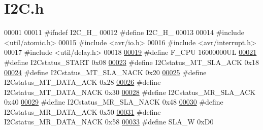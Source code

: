 \hypertarget{_i2_c_8h_source}{}\section{I2\+C.\+h}
\label{_i2_c_8h_source}

\begin{DoxyCode}
00001 
00011 \textcolor{preprocessor}{#ifndef I2C\_H\_}
00012 \textcolor{preprocessor}{#define I2C\_H\_}
00013 
00014 \textcolor{preprocessor}{#include <util/atomic.h>}
00015 \textcolor{preprocessor}{#include <avr/io.h>}
00016 \textcolor{preprocessor}{#include <avr/interrupt.h>}
00017 \textcolor{preprocessor}{#include <util/delay.h>}
00018 
\hypertarget{_i2_c_8h_source.tex_l00019}{}\hyperlink{_i2_c_8h_a43bafb28b29491ec7f871319b5a3b2f8}{00019} \textcolor{preprocessor}{#define F\_CPU 16000000UL                }
\hypertarget{_i2_c_8h_source.tex_l00021}{}\hyperlink{_i2_c_8h_ae106ed126eff0ffa33378daacfbbcdb7}{00021} \textcolor{preprocessor}{#define I2Cstatus\_START 0x08            }
\hypertarget{_i2_c_8h_source.tex_l00023}{}\hyperlink{_i2_c_8h_a86ef56020aa435f9af57015ee220c3e4}{00023} \textcolor{preprocessor}{#define I2Cstatus\_MT\_SLA\_ACK 0x18       }
\hypertarget{_i2_c_8h_source.tex_l00024}{}\hyperlink{_i2_c_8h_a28004b2b2ef10d3131ac4c4756da0ba0}{00024} \textcolor{preprocessor}{#define I2Cstatus\_MT\_SLA\_NACK 0x20      }
\hypertarget{_i2_c_8h_source.tex_l00025}{}\hyperlink{_i2_c_8h_a083e480a49a539cd4740d0e1a15216f3}{00025} \textcolor{preprocessor}{#define I2Cstatus\_MT\_DATA\_ACK 0x28      }
\hypertarget{_i2_c_8h_source.tex_l00026}{}\hyperlink{_i2_c_8h_a9de9a018a3f258d9e7a9ce44fb9e5cd1}{00026} \textcolor{preprocessor}{#define I2Cstatus\_MT\_DATA\_NACK 0x30     }
\hypertarget{_i2_c_8h_source.tex_l00028}{}\hyperlink{_i2_c_8h_af046bfee1b2f1837e8a043ead63f8152}{00028} \textcolor{preprocessor}{#define I2Cstatus\_MR\_SLA\_ACK 0x40       }
\hypertarget{_i2_c_8h_source.tex_l00029}{}\hyperlink{_i2_c_8h_ae17f24111fe34b4aa114e90824b7865a}{00029} \textcolor{preprocessor}{#define I2Cstatus\_MR\_SLA\_NACK 0x48      }
\hypertarget{_i2_c_8h_source.tex_l00030}{}\hyperlink{_i2_c_8h_aae56c6775054400d706c68b4701a1659}{00030} \textcolor{preprocessor}{#define I2Cstatus\_MR\_DATA\_ACK 0x50      }
\hypertarget{_i2_c_8h_source.tex_l00031}{}\hyperlink{_i2_c_8h_a3678a376b6b796511e60d0eda8a89dbe}{00031} \textcolor{preprocessor}{#define I2Cstatus\_MR\_DATA\_NACK 0x58     }
\hypertarget{_i2_c_8h_source.tex_l00033}{}\hyperlink{_i2_c_8h_a3df22e1e7b66be8b74b33ce077824292}{00033} \textcolor{preprocessor}{#define SLA\_W 0xD0                      }

\end{DoxyCode}
